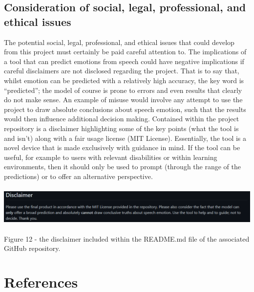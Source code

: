 \documentclass[12pt]{article}
\begin{document}
\subsection{Consideration of social, legal, professional, and ethical issues}
The potential social, legal, professional, and ethical issues that could develop from this project must certainly be paid careful attention to. The implications of a tool that can predict emotions from speech could have negative implications if careful disclaimers are not disclosed regarding the project. That is to say that, whilst emotion can be predicted with a relatively high accuracy, the key word is ``predicted''; the model of course is prone to errors and even results that clearly do not make sense. An example of misuse would involve any attempt to use the project to draw absolute conclusions about speech emotion, such that the results would then influence additional decision making. Contained within the project repository is a disclaimer highlighting some of the key points (what the tool is and isn't) along with a fair usage license (MIT License). Essentially, the tool is a novel device that is made exclusively with guidance in mind. If the tool can be useful, for example to users with relevant disabilities or within learning environments, then it should only be used to prompt (through the range of the predictions) or to offer an alternative perspective.
\begin{center}
\includegraphics[width=15cm, height=2cm]{figure_12_disclaimer}
\end{center}
Figure 12 - the disclaimer included within the README.md file of the associated GitHub repository.
\newpage

\section{References}
\end{document}
